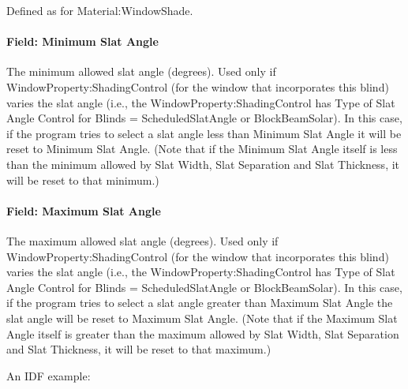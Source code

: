 Defined as for Material:WindowShade.

\paragraph{Field: Minimum Slat Angle}\label{field-minimum-slat-angle}

The minimum allowed slat angle (degrees). Used only if WindowProperty:ShadingControl (for the window that incorporates this blind) varies the slat angle (i.e., the WindowProperty:ShadingControl has Type of Slat Angle Control for Blinds = ScheduledSlatAngle or BlockBeamSolar). In this case, if the program tries to select a slat angle less than Minimum Slat Angle it will be reset to Minimum Slat Angle. (Note that if the Minimum Slat Angle itself is less than the minimum allowed by Slat Width, Slat Separation and Slat Thickness, it will be reset to that minimum.)

\paragraph{Field: Maximum Slat Angle}\label{field-maximum-slat-angle}

The maximum allowed slat angle (degrees). Used only if WindowProperty:ShadingControl (for the window that incorporates this blind) varies the slat angle (i.e., the WindowProperty:ShadingControl has Type of Slat Angle Control for Blinds = ScheduledSlatAngle or BlockBeamSolar). In this case, if the program tries to select a slat angle greater than Maximum Slat Angle the slat angle will be reset to Maximum Slat Angle. (Note that if the Maximum Slat Angle itself is greater than the maximum allowed by Slat Width, Slat Separation and Slat Thickness, it will be reset to that maximum.)

An IDF example:

